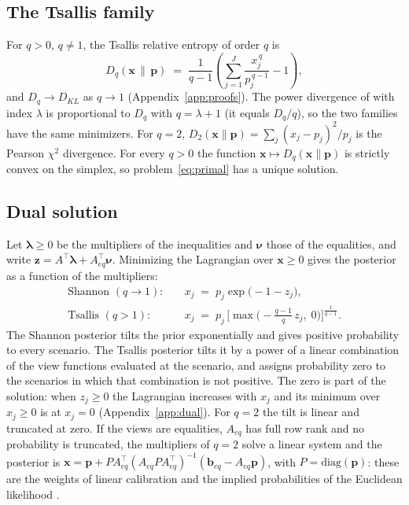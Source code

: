 \documentclass[11pt]{article}
\newcommand{\p}{\mathbf{p}}
\newcommand{\x}{\mathbf{x}}
\begin{document}
\subsection{The Tsallis family}

For $q > 0$, $q \neq 1$, the Tsallis relative entropy of order $q$ is
\begin{equation}\label{eq:tsallis}
D_q(\x \,\|\, \p) \;=\; \frac{1}{q-1}\left( \sum_{j=1}^{J} \frac{x_j^{\,q}}{p_j^{\,q-1}} - 1 \right),
\end{equation}
and $D_q \to D_{KL}$ as $q\to 1$ (Appendix~\ref{app:proofs}). The power
divergence of \citet{CressieRead1984} with index $\lambda$ is proportional
to $D_q$ with $q = \lambda + 1$ (it equals $D_q/q$), so the two families
have the same
minimizers. For $q=2$, $D_2(\x\|\p) = \sum_j (x_j-p_j)^2/p_j$ is the
Pearson $\chi^2$ divergence. For every $q>0$ the function
$\x \mapsto D_q(\x\|\p)$ is strictly convex on the simplex, so
problem~\eqref{eq:primal} has a unique solution.

\subsection{Dual solution}\label{sec:dual}

Let $\boldsymbol{\lambda} \ge 0$ be the multipliers of the inequalities and
$\boldsymbol{\nu}$ those of the equalities, and write
$\mathbf{z} = A^\top \boldsymbol{\lambda} + A_{eq}^\top \boldsymbol{\nu}$.
Minimizing the Lagrangian over $\x \ge 0$ gives the posterior as a function
of the multipliers:
\begin{align}
\text{Shannon } (q \to 1): \quad & x_j \;=\; p_j \exp\!\big( - 1 - z_j \big), \label{eq:kkt-shannon}\\[2pt]
\text{Tsallis } (q > 1): \quad & x_j \;=\; p_j \,\Big[ \max\!\Big( -\frac{q-1}{q}\, z_j,\; 0 \Big) \Big]^{\frac{1}{q-1}}. \label{eq:kkt-tsallis}
\end{align}
The Shannon posterior tilts the prior exponentially and gives positive
probability to every scenario. The Tsallis posterior tilts it by a power
of a linear combination of the view functions evaluated at the scenario,
and assigns probability zero to the scenarios in which that combination is
not positive. The zero is part of the
solution: when $z_j \ge 0$ the Lagrangian increases with $x_j$ and its
minimum over $x_j \ge 0$ is at $x_j = 0$ (Appendix~\ref{app:dual}). For
$q=2$ the tilt is linear and truncated at zero. If the views are equalities, $A_{eq}$ has full row rank
and no probability is truncated, the multipliers of $q=2$ solve a linear
system and the posterior is
$\x = \p + P A_{eq}^\top (A_{eq} P A_{eq}^\top)^{-1}
(\mathbf{b}_{eq} - A_{eq}\p)$, with $P = \mathrm{diag}(\p)$: these are the
weights of linear calibration \citep{DevilleSarndal1992} and the implied
probabilities of the Euclidean likelihood
\citep{AntoineBonnalRenault2007}.
\end{document}
